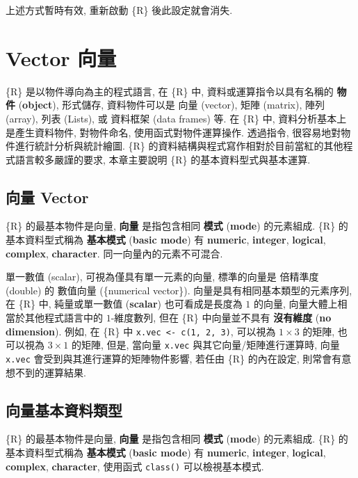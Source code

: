 \documentclass[
]{book}
\begin{document}
上述方式暫時有效, 重新啟動 \{R\} 後此設定就會消失.

\hypertarget{vector-ux5411ux91cf}{%
\chapter{Vector 向量}\label{vector-ux5411ux91cf}}

\{R\} 是以物件導向為主的程式語言,
在 \{R\} 中, 資料或運算指令以具有名稱的
\textbf{物件}
(\textbf{object}),
形式儲存,
資料物件可以是 向量 (vector),
矩陣 (matrix),
陣列 (array),
列表 (Lists),
或 資料框架 (data frames) 等.
在 \{R\} 中, 資料分析基本上是產生資料物件,
對物件命名, 使用函式對物件運算操作.
透過指令, 很容易地對物件進行統計分析與統計繪圖.
\{R\} 的資料結構與程式寫作相對於目前當紅的其他程式語言較多嚴謹的要求,
本章主要說明 \{R\} 的基本資料型式與基本運算.

\hypertarget{ux5411ux91cf-vector}{%
\section{向量 Vector}\label{ux5411ux91cf-vector}}

\{R\} 的最基本物件是向量,
\textbf{向量}
是指包含相同
\textbf{模式}
(\textbf{mode})
的元素組成.
\{R\} 的基本資料型式稱為
\textbf{基本模式}
(\textbf{basic mode}) 有
\textbf{numeric}, \textbf{integer}, \textbf{logical}, \textbf{complex}, \textbf{character}.
同一向量內的元素不可混合.

單一數值 (scalar), 可視為僅具有單一元素的向量,
標準的向量是
倍精準度 (double) 的
數值向量
(\{numerical vector\}).
向量是具有相同基本類型的元素序列,
在 \{R\} 中, 純量或單一數值
(\textbf{scalar})
也可看成是長度為 \(1\) 的向量,
向量大體上相當於其他程式語言中的 \(1\)-維度數列,
但在 \{R\} 中向量並不具有
\textbf{沒有維度}
(\textbf{no dimension}).
例如, 在 \{R\} 中 \texttt{x.vec\ \textless{}-\ c(1,\ 2,\ 3)},
可以視為 \(1 \times 3\) 的矩陣,
也可以視為 \(3 \times 1\) 的矩陣,
但是, 當向量 \texttt{x.vec} 與其它向量/矩陣進行運算時,
向量 \texttt{x.vec} 會受到與其進行運算的矩陣物件影響,
若任由 \{R\} 的內在設定,
則常會有意想不到的運算結果.

\hypertarget{ux5411ux91cfux57faux672cux8cc7ux6599ux985eux578b}{%
\section{向量基本資料類型}\label{ux5411ux91cfux57faux672cux8cc7ux6599ux985eux578b}}

\{R\} 的最基本物件是向量,
\textbf{向量}
是指包含相同
\textbf{模式}
(\textbf{mode})
的元素組成.
\{R\} 的基本資料型式稱為
\textbf{基本模式}
(\textbf{basic mode}) 有
\textbf{numeric}, \textbf{integer}, \textbf{logical}, \textbf{complex}, \textbf{character},
使用函式 \texttt{class()} 可以檢視基本模式.
\end{document}
